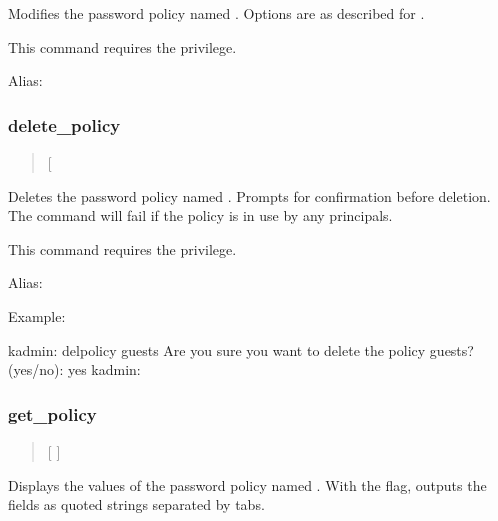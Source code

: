 \documentclass[letterpaper,10pt,english]{sphinxmanual}
\begin{document}
\sphinxAtStartPar
Modifies the password policy named .  Options are as described
for .

\sphinxAtStartPar
This command requires the  privilege.

\sphinxAtStartPar
Alias: 


\subsubsection{delete\_policy}
\label{\detokenize{admin/admin_commands/kadmin_local:delete-policy}}\label{\detokenize{admin/admin_commands/kadmin_local:id15}}\begin{quote}

\sphinxAtStartPar
{} {[}\sphinxstylestrong{\sphinxhyphen{}force}{]} 
\end{quote}

\sphinxAtStartPar
Deletes the password policy named .  Prompts for confirmation
before deletion.  The command will fail if the policy is in use by any
principals.

\sphinxAtStartPar
This command requires the  privilege.

\sphinxAtStartPar
Alias: 

\sphinxAtStartPar
Example:

\begin{sphinxVerbatim}[commandchars=\\\{\}]
kadmin: del\PYGZus{}policy guests
Are you sure you want to delete the policy \PYGZdq{}guests\PYGZdq{}?
(yes/no): yes
kadmin:
\end{sphinxVerbatim}


\subsubsection{get\_policy}
\label{\detokenize{admin/admin_commands/kadmin_local:get-policy}}\label{\detokenize{admin/admin_commands/kadmin_local:id16}}\begin{quote}

\sphinxAtStartPar
{} {[}  {]} 
\end{quote}

\sphinxAtStartPar
Displays the values of the password policy named .  With the
 flag, outputs the fields as quoted strings separated by
tabs.
\end{document}
